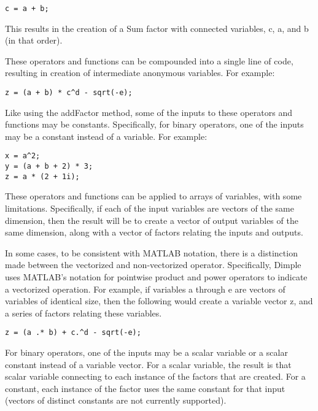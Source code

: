 \begin{lstlisting}
c = a + b;
\end{lstlisting}

This results in the creation of a Sum factor with connected variables, c, a, and b (in that order).

These operators and functions can be compounded into a single line of code, resulting in creation of intermediate anonymous variables.  For example:

\begin{lstlisting}
z = (a + b) * c^d - sqrt(-e);
\end{lstlisting}

Like using the addFactor method, some of the inputs to these operators and functions may be constants.  Specifically, for binary operators, one of the inputs may be a constant instead of a variable.  For example:

\begin{lstlisting}
x = a^2;
y = (a + b + 2) * 3;
z = a * (2 + 1i);
\end{lstlisting}

These operators and functions can be applied to arrays of variables, with some limitations.  Specifically, if each of the input variables are vectors of the same dimension, then the result will be to create a vector of output variables of the same dimension, along with a vector of factors relating the inputs and outputs.

In some cases, to be consistent with MATLAB notation, there is a distinction made between the vectorized and non-vectorized operator.  Specifically, Dimple uses MATLAB's notation for pointwise product and power operators to indicate a vectorized operation.  For example, if variables a through e are vectors of variables of identical size, then the following would create a variable vector z, and a series of factors relating these variables.

\begin{lstlisting}
z = (a .* b) + c.^d - sqrt(-e);
\end{lstlisting}

For binary operators, one of the inputs may be a scalar variable or a scalar constant instead of a variable vector.  For a scalar variable, the result is that scalar variable connecting to each instance of the factors that are created.  For a constant, each instance of the factor uses the same constant for that input (vectors of distinct constants are not currently supported).

